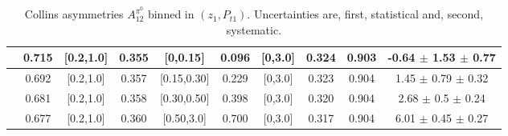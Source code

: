 \documentclass[aps,prX,preprint,groupedaddress,linenumbers]{revtex4-1}
\begin{document}
\begin{table}[H]
\begin{tabular}{|c| c| c| c| c| c| c| c| c| c|}
 \hline                                                                                                                                                          
[0.7,1.0]	&	0.715	&	[0.2,1.0]	&	0.355	&	[0,0.15]	&	0.096	&	[0,3.0]	&	0.324	&	0.903	&-0.64  $\pm$ 1.53  $\pm$ 0.77   \\ \hline
[0.7,1.0]	&	0.692	&	[0.2,1.0]	&	0.357	&	[0.15,0.30]	&	0.229	&	[0,3.0]	&	0.323	&	0.904	&1.45  $\pm$ 0.79  $\pm$ 0.32    \\ \hline
[0.7,1.0]	&	0.681	&	[0.2,1.0]	&	0.358	&	[0.30,0.50]	&	0.398	&	[0,3.0]	&	0.320	&	0.904	&2.68  $\pm$ 0.5  $\pm$ 0.24    \\ \hline          
[0.7,1.0]	&	0.677	&	[0.2,1.0]	&	0.360	&	[0.50,3.0]	&	0.700	&	[0,3.0]	&	0.317	&	0.904	& 6.01  $\pm$ 0.45  $\pm$ 0.27   \\ \hline
\end{tabular}
\caption[Collins asymmetries $A_{12}^{\pi^0}$ binned in $(z_{1},P_{t1})$]{Collins asymmetries $A_{12}^{\pi^0}$ binned in $(z_{1},P_{t1})$. Uncertainties are, first, statistical and, second, systematic.}
\label{tab:finalpi0ptbins}
\end{table}
\end{document}

